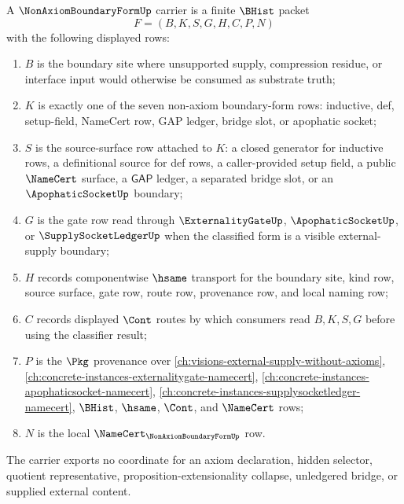 \begin{definition}
\label{def:non-axiom-boundary-form-carrier}
A $\NonAxiomBoundaryFormUp$ carrier is a finite $\BHist$ packet
$$
F=(B,K,S,G,H,C,P,N)
$$
with the following displayed rows:
\begin{enumerate}
\item $B$ is the boundary site where unsupported supply, compression residue, or interface input would otherwise be consumed as substrate truth;
\item $K$ is exactly one of the seven non-axiom boundary-form rows: inductive, def, setup-field, NameCert row, GAP ledger, bridge slot, or apophatic socket;
\item $S$ is the source-surface row attached to $K$: a closed generator for inductive rows, a definitional source for def rows, a caller-provided setup field, a public $\NameCert$ surface, a $\mathsf{GAP}$ ledger, a separated bridge slot, or an $\ApophaticSocketUp$ boundary;
\item $G$ is the gate row read through $\ExternalityGateUp$, $\ApophaticSocketUp$, or $\SupplySocketLedgerUp$ when the classified form is a visible external-supply boundary;
\item $H$ records componentwise $\hsame$ transport for the boundary site, kind row, source surface, gate row, route row, provenance row, and local naming row;
\item $C$ records displayed $\Cont$ routes by which consumers read $B,K,S,G$ before using the classifier result;
\item $P$ is the $\Pkg$ provenance over \autoref{ch:visions-external-supply-without-axioms}, \autoref{ch:concrete-instances-externalitygate-namecert}, \autoref{ch:concrete-instances-apophaticsocket-namecert}, \autoref{ch:concrete-instances-supplysocketledger-namecert}, $\BHist$, $\hsame$, $\Cont$, and $\NameCert$ rows;
\item $N$ is the local $\NameCert_{\NonAxiomBoundaryFormUp}$ row.
\end{enumerate}
The carrier exports no coordinate for an axiom declaration, hidden selector, quotient representative, proposition-extensionality collapse, unledgered bridge, or supplied external content.
\end{definition}

